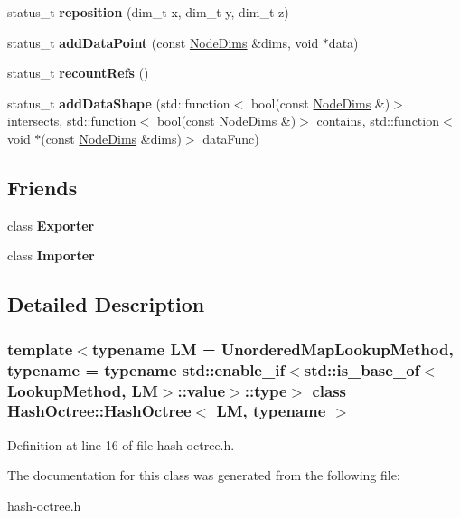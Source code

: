 \begin{DoxyCompactItemize}
status\+\_\+t {\bfseries reposition} (dim\+\_\+t x, dim\+\_\+t y, dim\+\_\+t z)
\item 
\mbox{\label{class_hash_octree_1_1_hash_octree_aedacd7d64e8ca54ef12f7edc65bfa609}} 
status\+\_\+t {\bfseries add\+Data\+Point} (const \mbox{\hyperlink{class_hash_octree_1_1_node_dims}{Node\+Dims}} \&dims, void $\ast$data)
\item 
\mbox{\label{class_hash_octree_1_1_hash_octree_a7afe494a353a2a7218d421ee0c78756d}} 
status\+\_\+t {\bfseries recount\+Refs} ()
\item 
\mbox{\label{class_hash_octree_1_1_hash_octree_ad8384c189348174bf10326c020a596fc}} 
status\+\_\+t {\bfseries add\+Data\+Shape} (std\+::function$<$ bool(const \mbox{\hyperlink{class_hash_octree_1_1_node_dims}{Node\+Dims}} \&)$>$ intersects, std\+::function$<$ bool(const \mbox{\hyperlink{class_hash_octree_1_1_node_dims}{Node\+Dims}} \&)$>$ contains, std\+::function$<$ void $\ast$(const \mbox{\hyperlink{class_hash_octree_1_1_node_dims}{Node\+Dims}} \&dims)$>$ data\+Func)
\end{DoxyCompactItemize}
\subsection*{Friends}
\begin{DoxyCompactItemize}
\item 
\mbox{\label{class_hash_octree_1_1_hash_octree_a2f641968ee4a70e8f584a437b28b8f5a}} 
class {\bfseries Exporter}
\item 
\mbox{\label{class_hash_octree_1_1_hash_octree_ad2d8744585dcb094644b1caed04ac9ed}} 
class {\bfseries Importer}
\end{DoxyCompactItemize}


\subsection{Detailed Description}
\subsubsection*{template$<$typename LM = Unordered\+Map\+Lookup\+Method, typename = typename std\+::enable\+\_\+if$<$std\+::is\+\_\+base\+\_\+of$<$\+Lookup\+Method, L\+M$>$\+::value$>$\+::type$>$\newline
class Hash\+Octree\+::\+Hash\+Octree$<$ L\+M, typename $>$}



Definition at line 16 of file hash-\/octree.\+h.



The documentation for this class was generated from the following file\+:\begin{DoxyCompactItemize}
\item 
hash-\/octree.\+h\end{DoxyCompactItemize}
